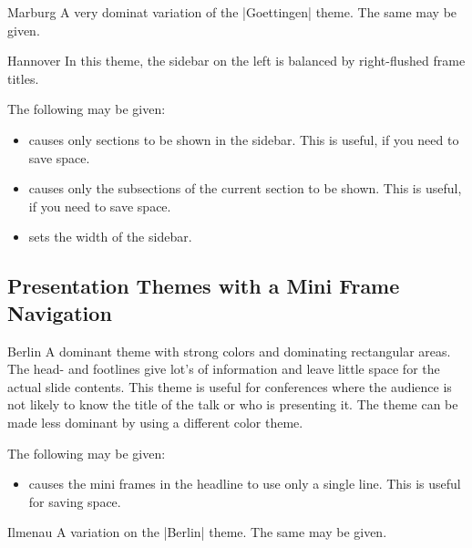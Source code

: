 \begin{themeexample}{Marburg}
  A very dominat variation of the |Goettingen| theme. The same
   may be given.
\end{themeexample}

\begin{themeexample}{Hannover}
  In this theme, the sidebar on the left is balanced by
  right-flushed frame titles.
    
  The following  may be given:
  \begin{itemize}
  \item {} causes only sections to be
    shown in the sidebar. This is useful, if you need to save
    space.
  \item {} causes only the subsections
    of the current section to be shown. This is useful, if you need to
    save  space.      
  \item {} sets the width of the
    sidebar.
  \end{itemize}
\end{themeexample}




\subsection{Presentation Themes with a Mini Frame Navigation}

\begin{themeexample}{Berlin}
  A dominant theme with strong colors and dominating rectangular
  areas. The head- and footlines give lot's of information and leave
  little space for the actual slide contents. This theme is useful for
  conferences where the audience is not likely to know the title of
  the talk or who is presenting it.  The theme can be made less
  dominant by using a different color theme.
  
  The following  may be given:
  \begin{itemize}
  \item {} causes the mini frames in the headline to
    use only a single line. This is useful for saving space.
  \end{itemize}
\end{themeexample}

\begin{themeexample}{Ilmenau}
  A variation on the |Berlin| theme. The same  may be
  given.  
\end{themeexample}

